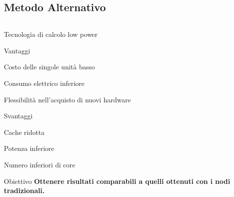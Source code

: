 \documentclass{beamer}
\begin{document}
\subsection{Metodo Alternativo}
\begin{frame}
\begin{columns}
\begin{column}{0.8\linewidth}		
\begin{block}{Tecnologia di calcolo low power}
\begin{itemize}
\begin{block}{Vantaggi}
\small
\item Costo delle singole unità basso
\item Consumo elettrico inferiore
\item Flessibilità nell'acquisto di nuovi hardware
\end{block}
\begin{block}{Svantaggi}
\small
\item Cache ridotta
\item Potenza inferiore
\item Numero inferiori di core
\end{block}
\end{itemize}
\end{block}
\begin{block}{Obiettivo}
\small
\textbf{Ottenere risultati
comparabili a quelli ottenuti con i nodi tradizionali.}
\end{block}
\end{column}
\end{columns}
\end{frame}
\end{document}

